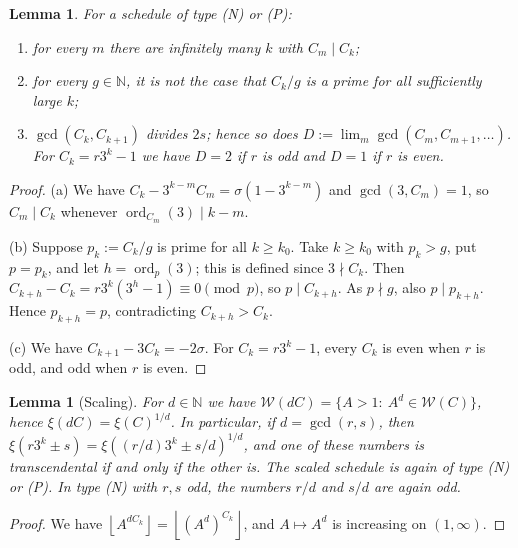 \documentclass[11pt,a4paper]{article}
\newtheorem{lemma}[theorem]{Lemma}
\theoremstyle{definition}
\theoremstyle{remark}
\newcommand{\N}{\mathbb{N}}
\DeclareMathOperator{\ord}{ord}
\newcommand{\floor}[1]{\left\lfloor #1\right\rfloor}
\begin{document}
\begin{lemma}\label{lem:schedules}
For a schedule of type \textup{(N)} or \textup{(P)}:
\begin{enumerate}[label=\textup{(\alph*)}]
\item for every $m$ there are infinitely many $k$ with $C_m\mid C_k$;
\item for every $g\in\N$, it is not the case that $C_k/g$ is a prime for all sufficiently large $k$;
\item $\gcd(C_k,C_{k+1})$ divides $2s$; hence so does $D:=\lim_m\gcd(C_m,C_{m+1},\dots)$. For $C_k=r3^k-1$ we have $D=2$ if $r$ is odd and $D=1$ if $r$ is even.
\end{enumerate}
\end{lemma}
\begin{proof}
(a) We have $C_k-3^{k-m}C_m=\sigma(1-3^{k-m})$ and $\gcd(3,C_m)=1$, so $C_m\mid C_k$ whenever $\ord_{C_m}(3)\mid k-m$.

(b) Suppose $p_k:=C_k/g$ is prime for all $k\ge k_0$. Take $k\ge k_0$ with $p_k>g$, put $p=p_k$, and let $h=\ord_p(3)$; this is defined since $3\nmid C_k$.
Then $C_{k+h}-C_k=r3^k(3^h-1)\equiv0\pmod p$, so $p\mid C_{k+h}$. As $p\nmid g$, also $p\mid p_{k+h}$. Hence $p_{k+h}=p$, contradicting $C_{k+h}>C_k$.

(c) We have $C_{k+1}-3C_k=-2\sigma$. For $C_k=r3^k-1$, every $C_k$ is even when $r$ is odd, and odd when $r$ is even.
\end{proof}

\begin{lemma}[Scaling]\label{lem:scaling}
For $d\in\N$ we have $\mathcal W(dC)=\{A>1:\ A^d\in\mathcal W(C)\}$, hence $\xi(dC)=\xi(C)^{1/d}$.
In particular, if $d=\gcd(r,s)$, then $\xi(r3^k\pm s)=\xi((r/d)3^k\pm s/d)^{1/d}$, and one of these numbers is transcendental if and only if the other is.
The scaled schedule is again of type \textup{(N)} or \textup{(P)}. In type (N) with $r,s$ odd, the numbers $r/d$ and $s/d$ are again odd.
\end{lemma}
\begin{proof}
We have $\floor{A^{dC_k}}=\floor{(A^d)^{C_k}}$, and $A\mapsto A^d$ is increasing on $(1,\infty)$.
\end{proof}
\end{document}
